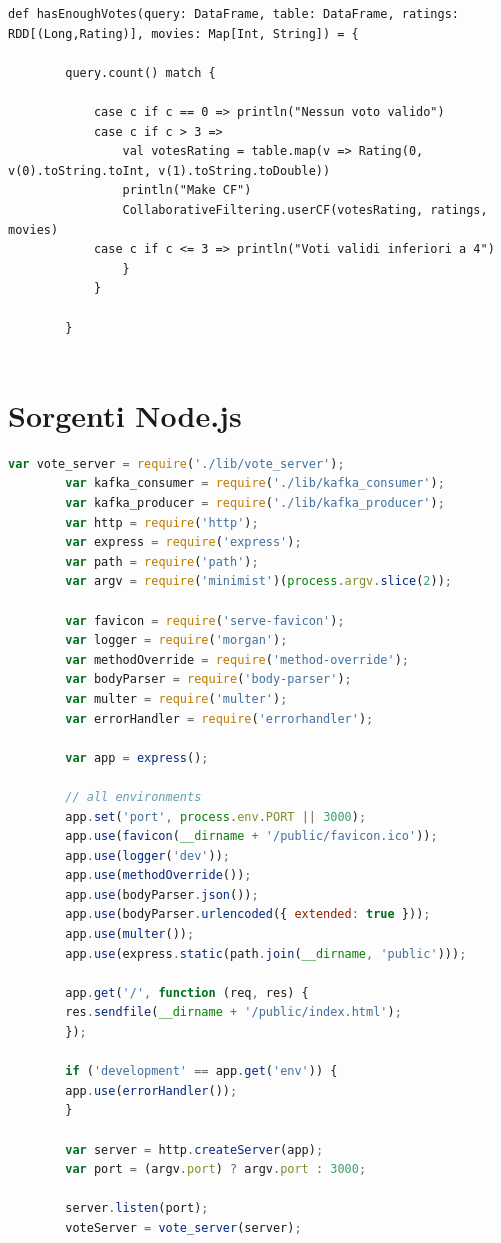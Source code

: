 \documentclass[12pt]{article}
\begin{document}
\begin{appendices}
\begin{lstlisting}[style=scalacode, caption=CEP.scala]
		def hasEnoughVotes(query: DataFrame, table: DataFrame, ratings: RDD[(Long,Rating)], movies: Map[Int, String]) = {
		
		query.count() match {
		
			case c if c == 0 => println("Nessun voto valido")
			case c if c > 3 =>
				val votesRating = table.map(v => Rating(0, v(0).toString.toInt, v(1).toString.toDouble))
				println("Make CF")
				CollaborativeFiltering.userCF(votesRating, ratings, movies)
			case c if c <= 3 => println("Voti validi inferiori a 4")
				}
			}
		
		}
		
	\end{lstlisting}
	\section{Sorgenti Node.js}
	
	\begin{lstlisting}[language=Javascript, caption=app.js]
		var vote_server = require('./lib/vote_server');
		var kafka_consumer = require('./lib/kafka_consumer');
		var kafka_producer = require('./lib/kafka_producer');
		var http = require('http');
		var express = require('express');
		var path = require('path');
		var argv = require('minimist')(process.argv.slice(2));
		
		var favicon = require('serve-favicon');
		var logger = require('morgan');
		var methodOverride = require('method-override');
		var bodyParser = require('body-parser');
		var multer = require('multer');
		var errorHandler = require('errorhandler');
		
		var app = express();
		
		// all environments
		app.set('port', process.env.PORT || 3000);
		app.use(favicon(__dirname + '/public/favicon.ico'));
		app.use(logger('dev'));
		app.use(methodOverride());
		app.use(bodyParser.json());
		app.use(bodyParser.urlencoded({ extended: true }));
		app.use(multer());
		app.use(express.static(path.join(__dirname, 'public')));
		
		app.get('/', function (req, res) {
		res.sendfile(__dirname + '/public/index.html');
		});
		
		if ('development' == app.get('env')) {
		app.use(errorHandler());
		}
		
		var server = http.createServer(app);
		var port = (argv.port) ? argv.port : 3000;
		
		server.listen(port);
		voteServer = vote_server(server);
		

\end{lstlisting}
\end{appendices}
\end{document}
